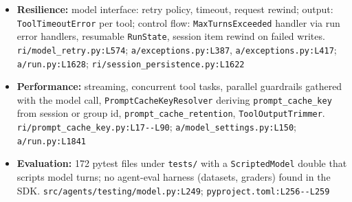 \begin{itemize}
\item \textbf{Resilience:} model interface: retry policy, timeout, request rewind; output: \texttt{ToolTimeoutError} per tool; control flow: \texttt{MaxTurnsExceeded} handler via run error handlers, resumable \texttt{RunState}, session item rewind on failed writes. \texttt{ri/\allowbreak{}model\_\allowbreak{}retry.\allowbreak{}py:\allowbreak{}L574}; \texttt{a/\allowbreak{}exceptions.\allowbreak{}py:\allowbreak{}L387}, \texttt{a/\allowbreak{}exceptions.\allowbreak{}py:\allowbreak{}L417}; \texttt{a/\allowbreak{}run.\allowbreak{}py:\allowbreak{}L1628}; \texttt{ri/\allowbreak{}session\_\allowbreak{}persistence.\allowbreak{}py:\allowbreak{}L1622}
\item \textbf{Performance:} streaming, concurrent tool tasks, parallel guardrails gathered with the model call, \texttt{PromptCacheKeyResolver} deriving \texttt{prompt\_\allowbreak{}cache\_\allowbreak{}key} from session or group id, \texttt{prompt\_\allowbreak{}cache\_\allowbreak{}retention}, \texttt{ToolOutputTrimmer}. \texttt{ri/\allowbreak{}prompt\_\allowbreak{}cache\_\allowbreak{}key.\allowbreak{}py:\allowbreak{}L17-\allowbreak{}-\allowbreak{}L90}; \texttt{a/\allowbreak{}model\_\allowbreak{}settings.\allowbreak{}py:\allowbreak{}L150}; \texttt{a/\allowbreak{}run.\allowbreak{}py:\allowbreak{}L1841}
\item \textbf{Evaluation:} 172 pytest files under \texttt{tests/\allowbreak{}} with a \texttt{ScriptedModel} double that scripts model turns; no agent-eval harness (datasets, graders) found in the SDK. \texttt{src/\allowbreak{}agents/\allowbreak{}testing/\allowbreak{}model.\allowbreak{}py:\allowbreak{}L249}; \texttt{pyproject.\allowbreak{}toml:\allowbreak{}L256-\allowbreak{}-\allowbreak{}L259}
\end{itemize}

